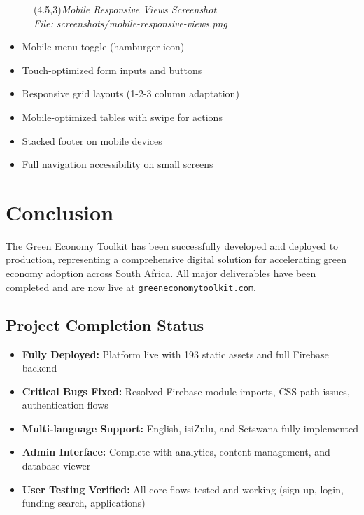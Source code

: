 \documentclass[a4paper,12pt]{article}
\begin{document}
\begin{figure}[h]
    \centering
    \framebox(4.5,3){\textit{Mobile Responsive Views Screenshot}}\\
    \small\textit{File: screenshots/mobile-responsive-views.png}
\end{figure}

\begin{itemize}
    \item Mobile menu toggle (hamburger icon)
    \item Touch-optimized form inputs and buttons
    \item Responsive grid layouts (1-2-3 column adaptation)
    \item Mobile-optimized tables with swipe for actions
    \item Stacked footer on mobile devices
    \item Full navigation accessibility on small screens
\end{itemize}

\section{Conclusion}

The Green Economy Toolkit has been successfully developed and deployed to production, representing a comprehensive digital solution for accelerating green economy adoption across South Africa. All major deliverables have been completed and are now live at \texttt{greeneconomytoolkit.com}.

\subsection{Project Completion Status}
\begin{itemize}
    \item \textbf{Fully Deployed:} Platform live with 193 static assets and full Firebase backend
    \item \textbf{Critical Bugs Fixed:} Resolved Firebase module imports, CSS path issues, authentication flows
    \item \textbf{Multi-language Support:} English, isiZulu, and Setswana fully implemented
    \item \textbf{Admin Interface:} Complete with analytics, content management, and database viewer
    \item \textbf{User Testing Verified:} All core flows tested and working (sign-up, login, funding search, applications)
\end{itemize}
\end{document}
